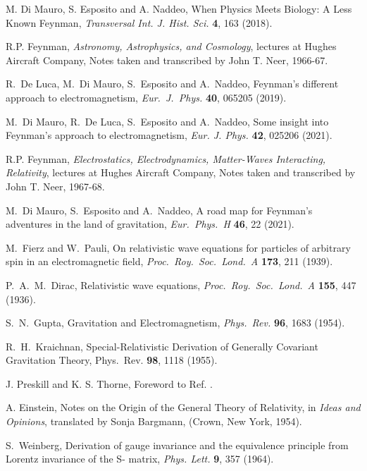 \documentclass{ws-procs961x669}            %
\begin{document}
\begin{thebibliography}{10}
M. Di Mauro, S. Esposito and A. Naddeo, When Physics Meets Biology: A Less Known Feynman, {\em Transversal Int. J. Hist. Sci.} {\bf 4}, 163 (2018).

R.P. Feynman, {\em Astronomy, Astrophysics, and Cosmology}, lectures at Hughes Aircraft Company, Notes taken and transcribed by John T. Neer, 1966-67.

R.~De Luca, M.~Di Mauro, S.~Esposito and A.~Naddeo, Feynman's different approach to electromagnetism, {\em Eur.\ J.\ Phys.} {\bf 40}, 065205 (2019).

M.~Di Mauro, R.~De Luca, S.~Esposito and A.~Naddeo, Some insight into Feynman's approach to electromagnetism, {\em Eur. J. Phys.} {\bf 42}, 025206 (2021).

R.P. Feynman, {\em Electrostatics, Electrodynamics, Matter-Waves Interacting, Relativity}, lectures at Hughes Aircraft Company, Notes taken and transcribed by John T. Neer, 1967-68.

M.~Di Mauro, S.~Esposito and A.~Naddeo, A road map for Feynman's adventures in the land of gravitation, {\em Eur.\ Phys.\ H} {\bf 46}, 22 (2021).

M.~Fierz and W.~Pauli, On relativistic wave equations for particles of arbitrary spin in an electromagnetic field,
{\em Proc.\ Roy.\ Soc.\ Lond.\ A} {\bf 173}, 211 (1939).

P.~A.~M.~Dirac, Relativistic wave equations, {\em Proc.\ Roy.\ Soc.\ Lond.\ A} {\bf 155}, 447 (1936).

S.~N.~Gupta, Gravitation and Electromagnetism, {\em Phys.\ Rev.} {\bf 96}, 1683 (1954).

R.~H.~Kraichnan, Special-Relativistic Derivation of Generally Covariant Gravitation Theory, {Phys.\ Rev.} {\bf 98}, 1118 (1955).

J. Preskill and K. S. Thorne, Foreword to Ref. \cite{Feynman:1996kb}.

A. Einstein, Notes on the Origin of the General Theory of Relativity, in {\em Ideas and Opinions}, translated by Sonja
Bargmann, (Crown, New York, 1954).

S.~Weinberg, Derivation of gauge invariance and the equivalence principle from Lorentz invariance of the S- matrix, {\em Phys. Lett.} {\bf 9}, 357 (1964).


\end{thebibliography}
\end{document}
